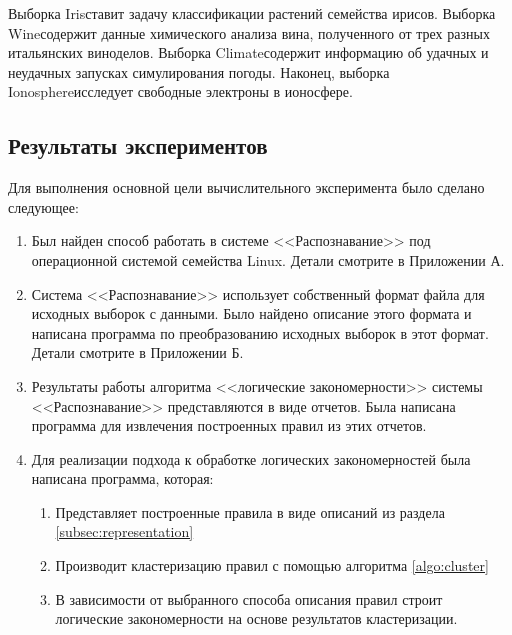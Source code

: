 \documentclass[12pt]{article}
\begin{document}
Выборка Iris\footnotemark[1] ставит задачу классификации растений
семейства ирисов. Выборка Wine\footnotemark[2] содержит данные
химического анализа вина, полученного от трех разных итальянских
виноделов. Выборка Climate\footnotemark[3] содержит информацию об
удачных и неудачных запусках симулирования погоды. Наконец, выборка
Ionosphere\footnotemark[4] исследует свободные электроны в ионосфере.


\subsection{Результаты экспериментов}

Для выполнения основной цели вычислительного эксперимента было сделано
следующее:
\begin{enumerate}
\item Был найден способ работать в системе <<Распознавание>> под
  операционной системой семейства Linux. Детали смотрите в Приложении
  А.
\item Система <<Распознавание>> использует собственный формат файла
  для исходных выборок с данными. Было найдено описание этого формата и
  написана программа по преобразованию исходных выборок в этот
  формат. Детали смотрите в Приложении Б.
\item Результаты работы алгоритма <<логические закономерности>>
  системы <<Распознавание>> представляются в виде отчетов. Была
  написана программа для извлечения построенных правил из этих
  отчетов.
\item Для реализации подхода к обработке логических закономерностей
  была написана программа, которая:
  \begin{enumerate}
  \item Представляет построенные правила в виде описаний из раздела
    \ref{subsec:representation}
  \item Производит кластеризацию правил с помощью алгоритма
    \ref{algo:cluster}
  \item В зависимости от выбранного способа описания правил строит
    логические закономерности на основе результатов кластеризации.
  \end{enumerate}
\end{enumerate}
\end{document}
